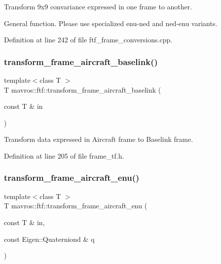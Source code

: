 Transform 9x9 convariance expressed in one frame to another. 

General function. Please use specialized enu-\/ned and ned-\/enu variants. 

Definition at line 242 of file ftf\+\_\+frame\+\_\+conversions.\+cpp.

\mbox{\label{group__nodelib_gad724ac71858730a830ae77b9dd480aaf}} 
\subsubsection{\texorpdfstring{transform\_frame\_aircraft\_baselink()}{transform\_frame\_aircraft\_baselink()}}
{\footnotesize\ttfamily template$<$class T $>$ \\
T mavros\+::ftf\+::transform\+\_\+frame\+\_\+aircraft\+\_\+baselink (\begin{DoxyParamCaption}\item[{const T \&}]{in }\end{DoxyParamCaption})\hspace{0.3cm}{\ttfamily [inline]}}



Transform data expressed in Aircraft frame to Baselink frame. 



Definition at line 205 of file frame\+\_\+tf.\+h.

\mbox{\label{group__nodelib_ga501a41c3a2de7186f4ed602a0399a75b}} 
\subsubsection{\texorpdfstring{transform\_frame\_aircraft\_enu()}{transform\_frame\_aircraft\_enu()}}
{\footnotesize\ttfamily template$<$class T $>$ \\
T mavros\+::ftf\+::transform\+\_\+frame\+\_\+aircraft\+\_\+enu (\begin{DoxyParamCaption}\item[{const T \&}]{in,  }\item[{const Eigen\+::\+Quaterniond \&}]{q }\end{DoxyParamCaption})\hspace{0.3cm}{\ttfamily [inline]}}



